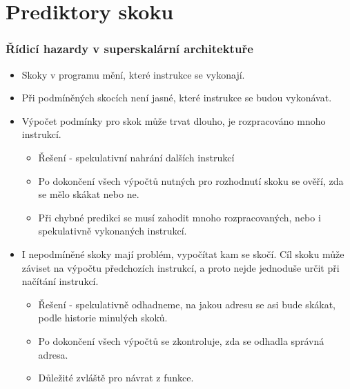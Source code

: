\documentclass{beamer}
\begin{document}
\section{Prediktory skoku}


\begin{frame}
\frametitle{Řídicí hazardy v superskalární architektuře}

\begin{itemize}
\item Skoky v programu mění, které instrukce se vykonají.
\item Při podmíněných skocích není jasné, které instrukce se budou vykonávat.
\item Výpočet podmínky pro skok může trvat dlouho, je rozpracováno mnoho instrukcí.
\begin{itemize}
\item Řešení - spekulativní nahrání dalších instrukcí
\item Po dokončení všech výpočtů nutných pro rozhodnutí skoku se ověří, zda se mělo skákat nebo ne.
\item Při chybné predikci se musí zahodit mnoho rozpracovaných, nebo i spekulativně vykonaných instrukcí.
\end{itemize}
\item I nepodmíněné skoky mají problém, vypočítat kam se skočí. Cíl skoku může záviset na výpočtu předchozích instrukcí, a proto nejde jednoduše určit při načítání instrukcí.
\begin{itemize}
\item Řešení - spekulativně odhadneme, na jakou adresu se asi bude skákat, podle historie minulých skoků.
\item Po dokončení všech výpočtů se zkontroluje, zda se odhadla správná adresa.
\item Důležité zvláště pro návrat z funkce.
\end{itemize}
\end{itemize}

\end{frame}
\end{document}
